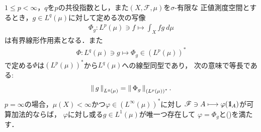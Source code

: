 	\begin{screen}
		\begin{thm}[$L^p$の共役空間]\label{thm:dual_space_of_L_p}
			$1 \leq p < \infty$，$q$を$p$の共役指数とし，また$(X,\mathscr{F},\mu)$を$\sigma$-有限な
			正値測度空間とするとき，$g \in L^q(\mu)$に対して定める次の写像
			\begin{align}
				\Phi_g: L^p(\mu) \ni f \longmapsto \int_X fg\ d\mu
				\label{eq:thm_dual_space_of_L_p_1}
			\end{align}
			は有界線形作用素となる．また
			\begin{align}
				\Phi: L^q(\mu) \ni g \longmapsto \Phi_g \in \left( L^p(\mu) \right)^*
			\end{align}
			で定める$\Phi$は$\left( L^p(\mu) \right)^*$から$L^q(\mu)$への線型同型であり，
			次の意味で等長である:
			\begin{align}
				\left\|\, g\, \right\|_{L^q(\mu)} = \left\|\, \Phi_g\, \right\|_{\left( L^p(\mu) \right)^*}.
				\label{eq:thm_dual_space_of_L_p_asseretion_2}
			\end{align}
			$p=\infty$の場合，$\mu(X) < \infty$かつ$\varphi \in \left( L^\infty(\mu) \right)^*$に対し
			$\mathscr{F} \ni A \longmapsto \varphi(\mbox{1}\hspace{-0.25em}\mbox{l}_A)$が可算加法的ならば，
			$\varphi$に対し或る$g \in L^1(\mu)$が唯一つ存在して
			$\varphi = \Phi_g$と()を満たす．
		\end{thm}
	\end{screen}
	
